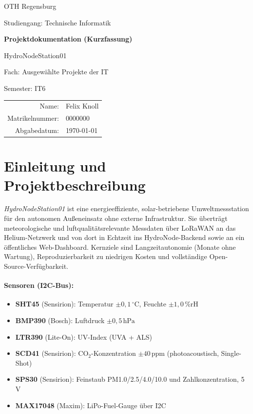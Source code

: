 \documentclass[11pt,a4paper]{scrartcl}
\begin{document}
\begin{titlepage}
  \centering
  \vspace*{2cm}
  {\Large OTH Regensburg\par}
  \vspace{0.8cm}
  {\large Studiengang: Technische Informatik\par}
  \vspace{2.5cm}
  {\Huge\bfseries Projektdokumentation (Kurzfassung)\par}
  \vspace{0.6cm}
  {\LARGE HydroNodeStation01\par}
  \vspace{1.5cm}
  {\large Fach: Ausgewählte Projekte der IT\par}
  \vspace{0.3cm}
  {\large Semester: IT6\par}
  \vfill
  \begin{tabular}{rl}
    Name:           & Felix Knoll \\
    Matrikelnummer: & 0000000 \\
    Abgabedatum:    & \today
  \end{tabular}
\end{titlepage}

\tableofcontents
\clearpage

\section{Einleitung und Projektbeschreibung}

\textit{HydroNodeStation01} ist eine energieeffiziente, solar-betriebene Umweltmessstation für den autonomen Außeneinsatz ohne externe Infrastruktur. Sie überträgt meteorologische und luftqualitätsrelevante Messdaten über LoRaWAN an das Helium-Netzwerk und von dort in Echtzeit ins HydroNode-Backend sowie an ein öffentliches Web-Dashboard. Kernziele sind Langzeitautonomie (Monate ohne Wartung), Reproduzierbarkeit zu niedrigen Kosten und vollständige Open-Source-Verfügbarkeit.

\paragraph{Sensoren (I2C-Bus):}
\begin{itemize}
  \item \textbf{SHT45} (Sensirion): Temperatur $\pm0{,}1\,^\circ$C, Feuchte $\pm1{,}0\,\%\text{rH}$
  \item \textbf{BMP390} (Bosch): Luftdruck $\pm0{,}5\,\text{hPa}$
  \item \textbf{LTR390} (Lite-On): UV-Index (UVA + ALS)
  \item \textbf{SCD41} (Sensirion): CO$_2$-Konzentration $\pm40\,\text{ppm}$ (photoacoustisch, Single-Shot)
  \item \textbf{SPS30} (Sensirion): Feinstaub PM1.0/2.5/4.0/10.0 und Zahlkonzentration, 5\,V
  \item \textbf{MAX17048} (Maxim): LiPo-Fuel-Gauge über I2C
\end{itemize}
\end{document}
